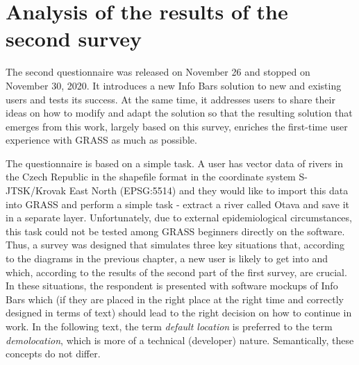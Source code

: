 \documentclass[a4paper,10pt,twoside]{article}
\begin{document}

\newpage
\vspace*{-1cm}
\section{Analysis of the results of the second survey}
\label{sec:qstat2}

\noindent The second questionnaire was released on November 26 and stopped on November 30, 2020. It introduces a new Info Bars solution to new and existing users and tests its success. At the same time, it addresses users to share their ideas on how to modify and adapt the solution so that the resulting solution that emerges from this work, largely based on this survey, enriches the first-time user experience with GRASS as much as possible.

The questionnaire is based on a simple task. A user has vector data of rivers in the Czech Republic in the shapefile format in the coordinate system S-JTSK/Krovak East North (EPSG:5514) and they would like to import this data into GRASS and perform a simple task - extract a river called Otava and save it in a separate layer. Unfortunately, due to external epidemiological circumstances, this task could not be tested among GRASS beginners directly on the software. Thus, a survey was designed that simulates three key situations that, according to the diagrams in the previous chapter, a new user is likely to get into and which, according to the results of the second part of the first survey, are crucial. In these situations, the respondent is presented with software mockups of Info Bars which (if they are placed in the right place at the right time and correctly designed in terms of text) should lead to the right decision on how to continue in work. In the following text, the term \textit{default location} is preferred to the term \textit{demolocation}, which is more of a technical (developer) nature. Semantically, these concepts do not differ.
\end{document}
